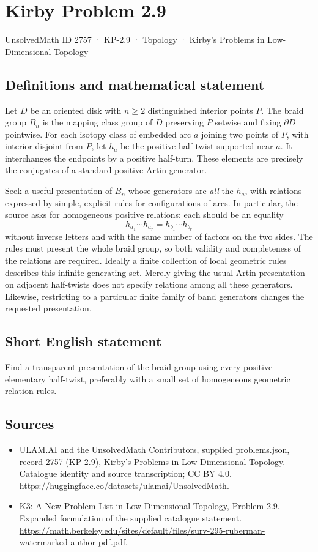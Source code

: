 \documentclass[11pt,a4paper]{article}
\begin{document}
\section*{Kirby Problem 2.9}\label{2757}
{\small UnsolvedMath ID 2757 · KP-2.9 · Topology · Kirby's Problems in Low-Dimensional Topology}
\subsection{Definitions and mathematical statement}
Let $D$ be an oriented disk with $n\geq2$ distinguished interior points $P$.
The braid group $B_n$ is the mapping class group of $D$ preserving $P$ setwise
and fixing $\partial D$ pointwise. For each isotopy class of embedded arc $a$
joining two points of $P$, with interior disjoint from $P$, let $h_a$ be the
positive half-twist supported near $a$. It interchanges the endpoints by a
positive half-turn. These elements are precisely the conjugates of a standard
positive Artin generator.

Seek a useful presentation of $B_n$ whose generators are \emph{all} the $h_a$,
with relations expressed by simple, explicit rules for configurations of arcs.
In particular, the source asks for homogeneous positive relations: each should
be an equality
\[
 h_{a_1}\cdots h_{a_r}=h_{b_1}\cdots h_{b_r}
\]
without inverse letters and with the same number of factors on the two sides.
The rules must present the whole braid group, so both validity and completeness
of the relations are required. Ideally a finite collection of local geometric
rules describes this infinite generating set. Merely giving the usual Artin
presentation on adjacent half-twists does not specify relations among all these
generators. Likewise, restricting to a particular finite family of band generators
changes the requested presentation.
\subsection{Short English statement}
Find a transparent presentation of the braid group using every positive elementary half-twist, preferably with a small set of homogeneous geometric relation rules.
\subsection{Sources}
\begin{itemize}
\item[S1] ULAM.AI and the UnsolvedMath Contributors, supplied problems.json, record 2757 (KP-2.9), Kirby's Problems in Low-Dimensional Topology. Catalogue identity and source transcription; CC BY 4.0.
\url{https://huggingface.co/datasets/ulamai/UnsolvedMath}.
\item[S2] K3: A New Problem List in Low-Dimensional Topology, Problem 2.9. Expanded formulation of the supplied catalogue statement.
\url{https://math.berkeley.edu/sites/default/files/surv-295-ruberman-watermarked-author-pdf.pdf}.
\end{itemize}
\end{document}
